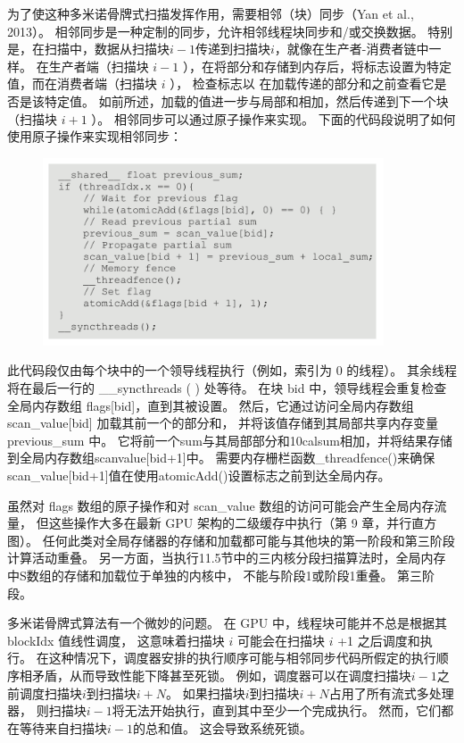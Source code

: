 为了使这种多米诺骨牌式扫描发挥作用，需要相邻（块）同步（Yan et al., 2013）。 
相邻同步是一种定制的同步，允许相邻线程块同步和/或交换数据。 
特别是，在扫描中，数据从扫描块$i-1$传递到扫描块$i$，就像在生产者-消费者链中一样。 
在生产者端（扫描块 $i-1$ ），在将部分和存储到内存后，将标志设置为特定值，而在消费者端（扫描块 $i$ ），
检查标志以 在加载传递的部分和之前查看它是否是该特定值。 
如前所述，加载的值进一步与局部和相加，然后传递到下一个块（扫描块 $i+1$ ）。 
相邻同步可以通过原子操作来实现。 下面的代码段说明了如何使用原子操作来实现相邻同步：

\begin{figure}[H]
	\centering
	\includegraphics[width=0.9\textwidth]{figs/F11-a7.png}
\end{figure}

此代码段仅由每个块中的一个领导线程执行（例如，索引为 0 的线程）。 
其余线程将在最后一行的 \_\_syncthreads ( ) 处等待。 
在块 bid 中，领导线程会重复检查全局内存数组 flags[bid]，直到其被设置。 
然后，它通过访问全局内存数组 scan\_value[bid] 加载其前一个的部分和，
并将该值存储到其局部共享内存变量 previous\_sum 中。 
它将前一个sum与其局部部分和10calsum相加，并将结果存储到全局内存数组scanvalue[bid+1]中。 
需要内存栅栏函数\_threadfence()来确保scan\_value[bid+1]值在使用atomicAdd()设置标志之前到达全局内存。

虽然对 flags 数组的原子操作和对 scan\_value 数组的访问可能会产生全局内存流量，
但这些操作大多在最新 GPU 架构的二级缓存中执行（第 9 章，并行直方图）。 
任何此类对全局存储器的存储和加载都可能与其他块的第一阶段和第三阶段计算活动重叠。 
另一方面，当执行11.5节中的三内核分段扫描算法时，全局内存中$\mathrm{S}$数组的存储和加载位于单独的内核中，
不能与阶段1或阶段1重叠。 第三阶段。

多米诺骨牌式算法有一个微妙的问题。 在 GPU 中，线程块可能并不总是根据其 blockIdx 值线性调度，
这意味着扫描块 $i$ 可能会在扫描块 $i$ +1 之后调度和执行。 
在这种情况下，调度器安排的执行顺序可能与相邻同步代码所假定的执行顺序相矛盾，从而导致性能下降甚至死锁。 
例如，调度器可以在调度扫描块$i-1$之前调度扫描块$i$到扫描块$i+N$。 如果扫描块$i$到扫描块$i+N$占用了所有流式多处理器，
则扫描块$i-1$将无法开始执行，直到其中至少一个完成执行。 然而，它们都在等待来自扫描块$i-1$的总和值。 这会导致系统死锁。

